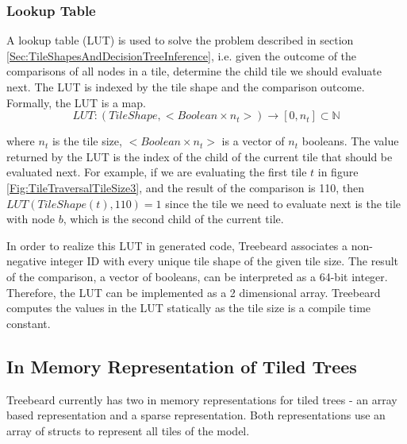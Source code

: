 \subsubsection{Lookup Table}
\label{sec:LookupTable}
A lookup table (LUT) is used to solve the problem described in section \ref{Sec:TileShapesAndDecisionTreeInference}, i.e. given the outcome of the comparisons of all nodes in a tile, determine the child tile we should evaluate next. The LUT is indexed by the tile shape and the comparison outcome. Formally, the LUT is a map.
\[
LUT : (TileShape, < Boolean \times n_t >) \rightarrow [0, n_t] \subset \mathbb{N}
\]

where $n_t$ is the tile size, $< Boolean \times n_t >$ is a vector of $n_t$ booleans. The value returned by the LUT is the index of the child of the current tile that should be evaluated next. For example, if we are evaluating the first tile $t$ in figure \ref{Fig:TileTraversalTileSize3}, and the result of the comparison is 110, then $LUT(TileShape(t), 110)=1$ since the tile we need to evaluate next is the tile with node $b$, which is the second child of the current tile.

In order to realize this LUT in generated code, Treebeard associates a non-negative integer ID with every unique tile shape of the given tile size. The result of the comparison, a vector of booleans, can be interpreted as a 64-bit integer. Therefore, the LUT can be implemented as a 2 dimensional array.
Treebeard computes the values in the LUT statically as the tile size is a compile time constant.

\subsection{In Memory Representation of Tiled Trees}
Treebeard currently has two in memory representations for tiled trees - an array based representation and a sparse representation. Both representations use an array of structs to represent all tiles of the model. 

